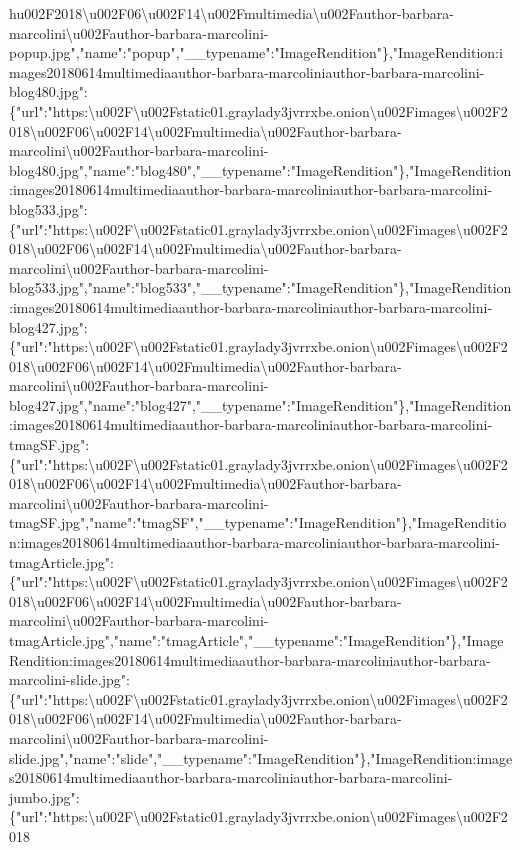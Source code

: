 h{}u002F2018\textbackslash{}u002F06\textbackslash{}u002F14\textbackslash{}u002Fmultimedia\textbackslash{}u002Fauthor-barbara-marcolini\textbackslash{}u002Fauthor-barbara-marcolini-popup.jpg","name":"popup","\_\_typename":"ImageRendition"\},"ImageRendition:images20180614multimediaauthor-barbara-marcoliniauthor-barbara-marcolini-blog480.jpg":\{"url":"https:\textbackslash{}u002F\textbackslash{}u002Fstatic01.graylady3jvrrxbe.onion\textbackslash{}u002Fimages\textbackslash{}u002F2018\textbackslash{}u002F06\textbackslash{}u002F14\textbackslash{}u002Fmultimedia\textbackslash{}u002Fauthor-barbara-marcolini\textbackslash{}u002Fauthor-barbara-marcolini-blog480.jpg","name":"blog480","\_\_typename":"ImageRendition"\},"ImageRendition:images20180614multimediaauthor-barbara-marcoliniauthor-barbara-marcolini-blog533.jpg":\{"url":"https:\textbackslash{}u002F\textbackslash{}u002Fstatic01.graylady3jvrrxbe.onion\textbackslash{}u002Fimages\textbackslash{}u002F2018\textbackslash{}u002F06\textbackslash{}u002F14\textbackslash{}u002Fmultimedia\textbackslash{}u002Fauthor-barbara-marcolini\textbackslash{}u002Fauthor-barbara-marcolini-blog533.jpg","name":"blog533","\_\_typename":"ImageRendition"\},"ImageRendition:images20180614multimediaauthor-barbara-marcoliniauthor-barbara-marcolini-blog427.jpg":\{"url":"https:\textbackslash{}u002F\textbackslash{}u002Fstatic01.graylady3jvrrxbe.onion\textbackslash{}u002Fimages\textbackslash{}u002F2018\textbackslash{}u002F06\textbackslash{}u002F14\textbackslash{}u002Fmultimedia\textbackslash{}u002Fauthor-barbara-marcolini\textbackslash{}u002Fauthor-barbara-marcolini-blog427.jpg","name":"blog427","\_\_typename":"ImageRendition"\},"ImageRendition:images20180614multimediaauthor-barbara-marcoliniauthor-barbara-marcolini-tmagSF.jpg":\{"url":"https:\textbackslash{}u002F\textbackslash{}u002Fstatic01.graylady3jvrrxbe.onion\textbackslash{}u002Fimages\textbackslash{}u002F2018\textbackslash{}u002F06\textbackslash{}u002F14\textbackslash{}u002Fmultimedia\textbackslash{}u002Fauthor-barbara-marcolini\textbackslash{}u002Fauthor-barbara-marcolini-tmagSF.jpg","name":"tmagSF","\_\_typename":"ImageRendition"\},"ImageRendition:images20180614multimediaauthor-barbara-marcoliniauthor-barbara-marcolini-tmagArticle.jpg":\{"url":"https:\textbackslash{}u002F\textbackslash{}u002Fstatic01.graylady3jvrrxbe.onion\textbackslash{}u002Fimages\textbackslash{}u002F2018\textbackslash{}u002F06\textbackslash{}u002F14\textbackslash{}u002Fmultimedia\textbackslash{}u002Fauthor-barbara-marcolini\textbackslash{}u002Fauthor-barbara-marcolini-tmagArticle.jpg","name":"tmagArticle","\_\_typename":"ImageRendition"\},"ImageRendition:images20180614multimediaauthor-barbara-marcoliniauthor-barbara-marcolini-slide.jpg":\{"url":"https:\textbackslash{}u002F\textbackslash{}u002Fstatic01.graylady3jvrrxbe.onion\textbackslash{}u002Fimages\textbackslash{}u002F2018\textbackslash{}u002F06\textbackslash{}u002F14\textbackslash{}u002Fmultimedia\textbackslash{}u002Fauthor-barbara-marcolini\textbackslash{}u002Fauthor-barbara-marcolini-slide.jpg","name":"slide","\_\_typename":"ImageRendition"\},"ImageRendition:images20180614multimediaauthor-barbara-marcoliniauthor-barbara-marcolini-jumbo.jpg":\{"url":"https:\textbackslash{}u002F\textbackslash{}u002Fstatic01.graylady3jvrrxbe.onion\textbackslash{}u002Fimages\textbackslash{}u002F2018\textback
